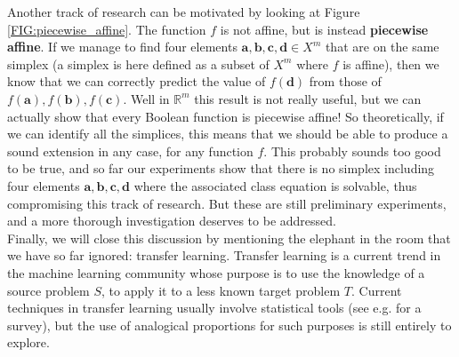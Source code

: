 Another track of research can be motivated by looking at Figure
\ref{FIG:piecewise_affine}. The function $f$ is not affine, but is instead
\textbf{piecewise affine}. If we manage to find four elements $\mathbf{a},
\mathbf{b}, \mathbf{c}, \mathbf{d} \in X^m$ that are on the same simplex (a
simplex is here defined as a subset of $X^m$ where $f$ is affine), then we know
that we can correctly predict the value of $f(\mathbf{d})$ from those of
$f(\mathbf{a}), f(\mathbf{b}), f(\mathbf{c})$. Well in $\mathbb{R}^m$ this
result is not really useful, but we can actually show that every Boolean
function is piecewise affine! So theoretically, if we can identify all the
simplices, this means that we should be able to produce a sound extension in any
case, for any function $f$. This probably sounds too good to be true, and so
far our experiments show that there is no simplex including four elements
$\mathbf{a}, \mathbf{b}, \mathbf{c}, \mathbf{d}$ where the associated class
equation is solvable, thus compromising this track of research. But these are
still preliminary experiments, and a more thorough investigation deserves to be
addressed.\\

Finally, we will close this discussion by mentioning the elephant in the room
that we have so far ignored: transfer learning. Transfer learning is a current
trend in the machine learning community whose purpose is to use the knowledge
of a source problem $S$, to apply it to a less known target problem $T$.
Current techniques in transfer learning usually involve statistical tools (see
e.g. \cite{PanYanTKDE10} for a survey), but the use of analogical proportions
for such purposes is still entirely to explore.
